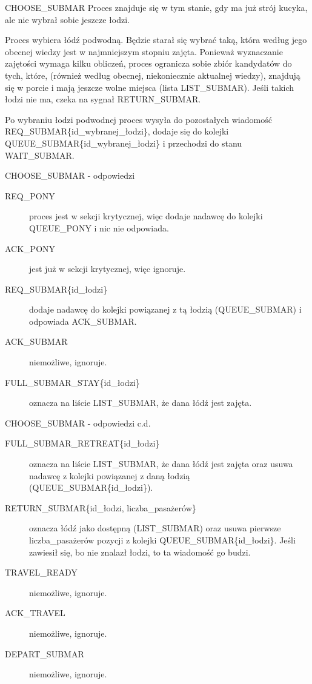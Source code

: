 \documentclass{beamer}
\begin{document}
\begin{frame}{CHOOSE\_SUBMAR}
    \internallinenumbers
    \resetlinenumber[1]
    Proces znajduje się w tym stanie, gdy ma już strój kucyka, ale nie wybrał sobie jeszcze łodzi.

    \vspace{0.4cm}
    Proces wybiera łódź podwodną. Będzie starał się wybrać taką, która według jego obecnej wiedzy jest w najmniejszym stopniu zajęta. Ponieważ wyznaczanie zajętości wymaga kilku obliczeń, proces ogranicza sobie zbiór kandydatów do tych, które, (również według obecnej, niekoniecznie aktualnej wiedzy), znajdują się w porcie i mają jeszcze wolne miejsca (lista LIST\_SUBMAR). Jeśli takich łodzi nie ma, czeka na sygnał RETURN\_SUBMAR.
    
    \vspace{0.4cm}
    Po wybraniu łodzi podwodnej proces wysyła do pozostałych wiadomość REQ\_SUBMAR\{id\_wybranej\_łodzi\}, dodaje się do kolejki QUEUE\_SUBMAR\{id\_wybranej\_łodzi\} i przechodzi do stanu WAIT\_SUBMAR.
\end{frame}

\begin{frame}{CHOOSE\_SUBMAR - odpowiedzi}
    \internallinenumbers
    \resetlinenumber[1]
    \begin{description}
        \item [REQ\_PONY] proces jest w sekcji krytycznej, więc dodaje nadawcę do kolejki QUEUE\_PONY i nic nie odpowiada. 
        \item [ACK\_PONY] jest już w sekcji krytycznej, więc ignoruje.
        \item [REQ\_SUBMAR\{id\_łodzi\}] dodaje nadawcę do kolejki powiązanej z tą łodzią (QUEUE\_SUBMAR) i odpowiada ACK\_SUBMAR.
        \item [ACK\_SUBMAR] niemożliwe, ignoruje.
        \item [FULL\_SUBMAR\_STAY\{id\_łodzi\}] oznacza na liście LIST\_SUBMAR, że dana łódź jest zajęta.

    \end{description}
\end{frame}

\begin{frame}{CHOOSE\_SUBMAR - odpowiedzi c.d.}
    \internallinenumbers
    \resetlinenumber[1]
    \begin{description}
        \item [FULL\_SUBMAR\_RETREAT\{id\_łodzi\}] oznacza na liście LIST\_SUBMAR, że dana łódź jest zajęta oraz usuwa nadawcę z kolejki powiązanej z daną łodzią (QUEUE\_SUBMAR\{id\_łodzi\}).
        \item [RETURN\_SUBMAR\{id\_łodzi, liczba\_pasażerów\}] oznacza łódź jako dostępną (LIST\_SUBMAR) oraz usuwa pierwsze liczba\_pasażerów pozycji z kolejki QUEUE\_SUBMAR\{id\_łodzi\}. Jeśli zawiesił się, bo nie znalazł łodzi, to ta wiadomość go budzi.
        \item [TRAVEL\_READY] niemożliwe, ignoruje.
        \item [ACK\_TRAVEL] niemożliwe, ignoruje.
        \item [DEPART\_SUBMAR] niemożliwe, ignoruje.
    \end{description}
\end{frame}
\end{document}

